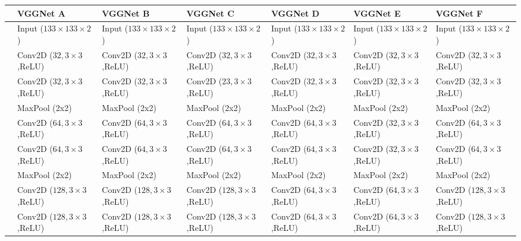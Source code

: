 \begin{table}
    \centering
    \tiny
    \begin{tabular}{l|l|l|l|l|l|l}
         \toprule
         &\textbf{VGGNet A} & \textbf{VGGNet B} & \textbf{VGGNet C} & \textbf{VGGNet D} & \textbf{VGGNet E} & \textbf{VGGNet F} \\
         \midrule
         
         &Input ($133\times133\times2$) & Input ($133\times133\times2$) & Input ($133\times133\times2$) & Input ($133\times133\times2$) & Input ($133\times133\times2$) & Input ($133\times133\times2$) \\
         
         &Conv2D ($32,3\times3$,ReLU) & Conv2D ($32,3\times3$,ReLU) & Conv2D ($32,3\times3$,ReLU) & Conv2D ($32,3\times3$,ReLU) & Conv2D ($32,3\times3$,ReLU) & Conv2D ($32,3\times3$,ReLU) \\
         
         &Conv2D ($32,3\times3$,ReLU) & Conv2D ($32,3\times3$,ReLU) & Conv2D ($23,3\times3$,ReLU) & Conv2D ($32,3\times3$,ReLU) & Conv2D ($32,3\times3$,ReLU) & Conv2D ($32,3\times3$,ReLU) \\
         
         &MaxPool (2x2) & MaxPool (2x2) & MaxPool (2x2) & MaxPool (2x2) & MaxPool (2x2) & MaxPool (2x2) \\
         \midrule
         
         &Conv2D ($64,3\times3$,ReLU) & Conv2D ($64,3\times3$,ReLU) & Conv2D ($64,3\times3$,ReLU) & Conv2D ($64,3\times3$,ReLU) & Conv2D ($32,3\times3$,ReLU) & Conv2D ($64,3\times3$,ReLU) \\
         
         &Conv2D ($64,3\times3$,ReLU) & Conv2D ($64,3\times3$,ReLU) & Conv2D ($64,3\times3$,ReLU) & Conv2D ($64,3\times3$,ReLU) & Conv2D ($32,3\times3$,ReLU) & Conv2D ($64,3\times3$,ReLU) \\
         
         &MaxPool (2x2) & MaxPool (2x2) & MaxPool (2x2) & MaxPool (2x2) & MaxPool (2x2) & MaxPool (2x2) \\
         \midrule
         
         &Conv2D ($128,3\times3$,ReLU) & Conv2D ($128,3\times3$,ReLU) & Conv2D ($128,3\times3$,ReLU) & Conv2D ($64,3\times3$,ReLU) & Conv2D ($64,3\times3$,ReLU) & Conv2D ($128,3\times3$,ReLU) \\
         
         &Conv2D ($128,3\times3$,ReLU) & Conv2D ($128,3\times3$,ReLU) & Conv2D ($128,3\times3$,ReLU) & Conv2D ($64,3\times3$,ReLU) & Conv2D ($64,3\times3$,ReLU) & Conv2D ($128,3\times3$,ReLU) \\
         

\end{tabular}
\end{table}
